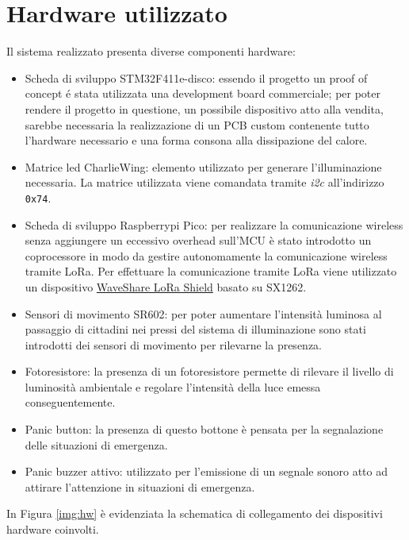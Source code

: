 \documentclass{article}
\begin{document}
	\section{Hardware utilizzato}
	Il sistema realizzato presenta diverse componenti hardware:
	\begin{itemize}
		\item Scheda di sviluppo STM32F411e-disco: essendo il progetto un proof of concept é stata utilizzata una development board commerciale; per poter rendere il progetto in questione, un possibile dispositivo atto alla vendita, sarebbe necessaria la realizzazione di un PCB custom contenente tutto l'hardware necessario e una forma consona alla dissipazione del calore.
		\item Matrice led CharlieWing: elemento utilizzato per generare l'illuminazione necessaria. La matrice utilizzata viene comandata tramite \textit{i2c} all'indirizzo \texttt{0x74}.
		\item Scheda di sviluppo Raspberrypi Pico: per realizzare la comunicazione wireless senza aggiungere un eccessivo overhead sull'MCU \`e stato introdotto un coprocessore in modo da gestire autonomamente la comunicazione wireless tramite LoRa. 	Per effettuare la comunicazione tramite LoRa viene utilizzato un dispositivo \href{https://www.waveshare.com/wiki/Pico-LoRa-SX1262}{WaveShare LoRa Shield} basato su SX1262.
		\item Sensori di movimento SR602: per poter aumentare l'intensit\`a luminosa al passaggio di cittadini nei pressi del sistema di illuminazione sono stati introdotti dei sensori di movimento per rilevarne la presenza.
		\item Fotoresistore: la presenza di un fotoresistore permette di rilevare il livello di luminosit\`a ambientale e regolare l'intensit\`a della luce emessa conseguentemente.
		\item Panic button: la presenza di questo bottone \`e pensata per la segnalazione delle situazioni di emergenza.
		\item Panic buzzer attivo: utilizzato per l'emissione di un segnale sonoro atto ad attirare l'attenzione in situazioni di emergenza.
	\end{itemize}
	In Figura \ref{img:hw} \`e evidenziata la schematica di collegamento dei dispositivi hardware coinvolti.
	
\end{document}
